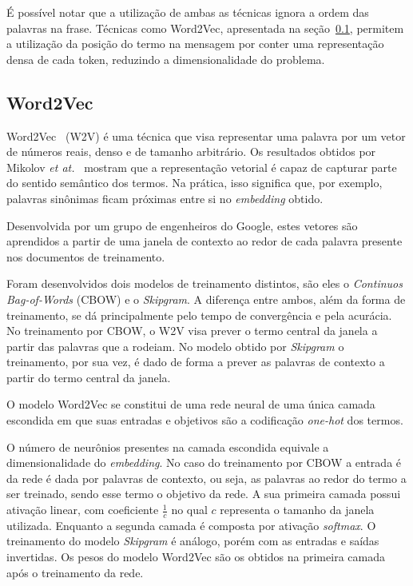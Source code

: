 É possível notar que a utilização de ambas as técnicas ignora a ordem das palavras na frase.
Técnicas como Word2Vec, apresentada na seção~\ref{sec:w2v}, permitem a utilização da posição do termo na mensagem por conter
uma representação densa de cada token, reduzindo a dimensionalidade do problema.

\subsection{Word2Vec} \label{sec:w2v}

Word2Vec~\cite{mikolov13} (W2V) é uma técnica que visa representar uma palavra por um vetor de números reais, denso e de
tamanho arbitrário.
Os resultados obtidos por Mikolov \textit{et at.}~\cite{mikolov13} mostram que a representação vetorial é capaz de
capturar parte do sentido semântico dos termos.
Na prática, isso significa que, por exemplo, palavras sinônimas ficam próximas entre si no \textit{embedding} obtido.

Desenvolvida por um grupo de engenheiros do Google, estes vetores são aprendidos a partir de uma janela de contexto
ao redor de cada palavra presente nos documentos de treinamento.

Foram desenvolvidos dois modelos de treinamento distintos, são eles o \textit{Continuos Bag-of-Words} (CBOW) e o
\textit{Skipgram}.
A diferença entre ambos, além da forma de treinamento, se dá principalmente pelo tempo de convergência e pela acurácia.
No treinamento por CBOW, o W2V visa prever o termo central da janela a partir das palavras que a rodeiam.
No modelo obtido por \textit{Skipgram} o treinamento, por sua vez, é dado de forma a prever as palavras de contexto a
partir do termo central da janela.

O modelo Word2Vec se constitui de uma rede neural de uma única camada escondida em que suas entradas e objetivos são a
codificação \textit{one-hot} dos termos.

O número de neurônios presentes na camada escondida equivale a dimensionalidade do \textit{embedding}.
No caso do treinamento por CBOW a entrada é da rede é dada por palavras de contexto, ou seja, as palavras ao redor do
termo a ser treinado, sendo esse termo o objetivo da rede.
A sua primeira camada possui ativação linear, com coeficiente $\frac{1}{c}$ no qual $c$ representa o tamanho da janela
utilizada.
Enquanto a segunda camada é composta por ativação \textit{softmax}.
O treinamento do modelo \textit{Skipgram} é análogo, porém com as entradas e saídas invertidas.
Os pesos do modelo Word2Vec são os obtidos na primeira camada após o treinamento da rede.

